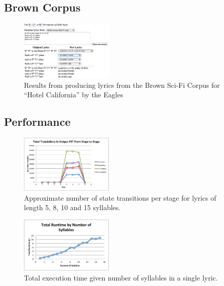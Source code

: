 \documentclass{vgtc}                          %
\begin{document}
\subsection{Brown Corpus}

\begin{figure}[t]
\centering
\includegraphics[width=0.4\textwidth]{images/png/hotel_california5.png}
\caption{Results from producing lyrics from the Brown Sci-Fi Corpus for ``Hotel California'' by the
Eagles}
\label{fig:beatles}
\end{figure}


\subsection{Performance}
\begin{figure}[t]
\centering
\includegraphics[width=0.4\textwidth]{images/pdf/transitions_per_stage.pdf}
\caption{Approximate number of state transitions per stage for lyrics of length 5, 8, 10 and 15 syllables.}
\label{fig:perf2}
\end{figure}

\begin{figure}[t]
\centering
\includegraphics[width=0.4\textwidth]{images/pdf/runtime_by_syllables.pdf}
\caption{Total execution time given number of syllables in a single lyric.}
\label{fig:perf2}
\end{figure}
\end{document}
